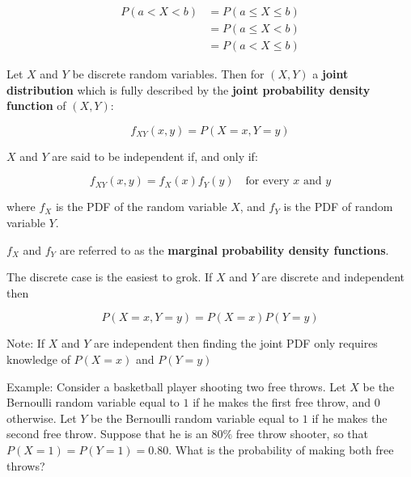 \documentclass[11pt]{article}
\begin{document}
\begin{align*}
P(a < X < b) &= P(a \leq X \leq b) \\
             &= P(a \leq X < b)    \\
             &= P(a < X \leq b)
\end{align*}


\vspace{2mm}

Let $X$ and $Y$ be discrete random variables. Then for $(X,Y)$ a \textbf{joint distribution} which is
fully described by the \textbf{joint probability density function} of $(X,Y)$:

\begin{equation*}
f_{XY}(x, y) = P(X = x, Y = y)
\end{equation*} 

\vspace{2mm}

$X$ and $Y$ are said to be independent if, and only if:

\begin{equation*}
f_{XY}(x,y) = f_{X}(x) f_{Y}(y) \quad \mbox{for every $x$ and $y$}
\end{equation*}

where $f_{X}$ is the PDF of the random variable $X$, and $f_{Y}$ is the PDF of random variable $Y$.

\vspace{2mm}

$f_{X}$ and $f_{Y}$ are referred to as the \textbf{marginal probability density functions}.

\vspace{2mm}

The discrete case is the easiest to grok. If $X$ and $Y$ are discrete and independent then

\begin{equation*}
P(X=x, Y=y) = P(X=x)P(Y=y)
\end{equation*}

\vspace{2mm}

Note: If $X$ and $Y$ are independent then finding the joint PDF only requires knowledge of
$P(X=x)$ and $P(Y=y)$

\vspace{2mm}

Example: Consider a basketball player shooting two free throws. Let $X$ be the Bernoulli random variable
equal to $1$ if he makes the first free throw, and $0$ otherwise. Let $Y$ be the Bernoulli random
variable equal to $1$ if he makes the second free throw. Suppose that he is an $80\%$ free throw 
shooter, so that $P(X=1) = P(Y=1) = 0.80$. What is the probability of making both free throws?
\end{document}
